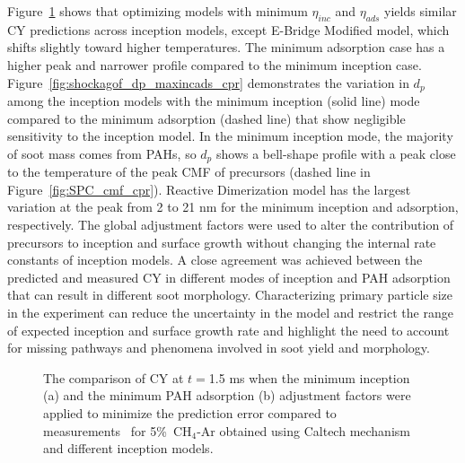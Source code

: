 Figure~\ref{fig:shockagof_yield_maxincads_cpr} shows that optimizing models with minimum $\eta_{inc}$ and $\eta_{ads}$ yields similar CY predictions across inception models, except E-Bridge Modified model, which shifts slightly toward higher temperatures. The minimum adsorption case has a higher peak and narrower profile compared to the minimum inception case. Figure~\ref{fig:shockagof_dp_maxincads_cpr} demonstrates the variation in $d_p$ among the inception models with the minimum inception (solid line) mode compared to the minimum adsorption (dashed line) that show negligible sensitivity to the inception model. In the minimum inception mode, the majority of soot mass comes from PAHs, so $d_p$ shows a bell-shape profile with a peak close to the temperature of the peak CMF of precursors (dashed line in Figure~\ref{fig:SPC_cmf_cpr}). Reactive Dimerization model has the largest variation at the peak from 2 to 21 nm for the minimum inception and adsorption, respectively. The global adjustment factors were used to alter the contribution of precursors to inception and surface growth without changing the internal rate constants of inception models. A close agreement was achieved between the predicted and measured CY in different modes of inception and PAH adsorption that can result in different soot morphology. Characterizing primary particle size in the experiment can reduce the uncertainty in the model and restrict the range of expected inception and surface growth rate and highlight the need to account for missing pathways and phenomena involved in soot yield and morphology.

\begin{figure}[H]
	\centering
	\caption{The comparison of CY at $t=$1.5 ms when the minimum inception (a) and the minimum PAH adsorption (b) adjustment factors were applied to minimize the prediction error compared to measurements~\citep{agafonov2016unified} for 5\%~$\mathrm{CH_4}$-Ar obtained using Caltech mechanism and different inception models.}
	\label{fig:shockagof_yield_maxincads_cpr} 
\end{figure}

